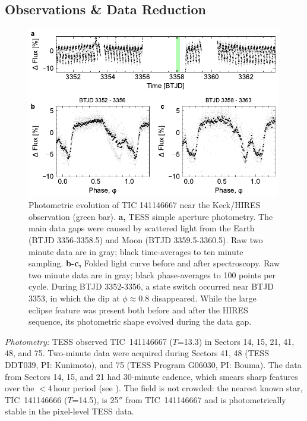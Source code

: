 \documentclass{nature3}
\begin{document}
\newpage
\begin{methods}

\renewcommand{\figurename}{Extended Data Figure}
\renewcommand{\tablename}{Extended Data Table}
\setcounter{table}{0}  
\setcounter{figure}{0}  

\subsection{Observations \& Data Reduction}\phantom{+}

\begin{figure}[!b]
  \centering
  \includegraphics[width=0.99\textwidth]{figures/sf1.pdf}
  \caption{Photometric evolution of TIC 141146667 near the Keck/HIRES
  observation (green bar). 
  {\bf a,} TESS simple aperture photometry.  The main data gaps were
  caused by scattered light from the Earth (BTJD 3356-3358.5) and Moon
  (BTJD 3359.5-3360.5).  Raw two minute data are in gray; black
  time-averages to ten minute sampling.
  {\bf b-c,} Folded light curve before and after spectroscopy.  Raw
  two minute data are in gray; black phase-averages to 100 points per
  cycle.  During BTJD 3352-3356, a state switch occurred near BTJD
  3353, in which the dip at $\phi$$\approx$0.8 disappeared.  While the
  large eclipse feature was present both before and after the HIRES
  sequence, its photometric shape evolved during the data gap.
  }
  \label{fig:fulllc}
\end{figure}

{\it Photometry:} TESS observed TIC~141146667 ($T$=13.3) in Sectors 14,
15, 21, 41, 48, and 75.  Two-minute data were acquired during Sectors
41, 48 (TESS DDT039, PI: Kunimoto), and 75 (TESS Program G06030, PI:
Bouma).  The data from Sectors 14, 15, and 21 had 30-minute cadence,
which smears sharp features over the $<$4\,hour period (see
\cite{Gunther2022}).  The field is not crowded:  the nearest known
star, TIC~141146666 ($T$=14.5), is 25$''$ from TIC~141146667 and is
photometrically stable in the pixel-level TESS data.


\end{methods}
\end{document}
